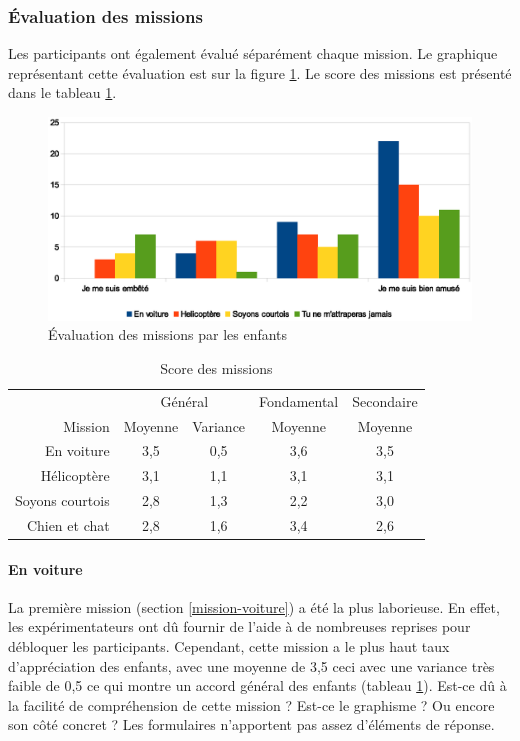 \subsubsection{Évaluation des missions}
\label{appreciation}
Les participants ont également évalué séparément chaque mission. Le graphique représentant cette évaluation est sur la figure \ref{fig:evaluation-mission}. Le score des \glspl{mission} est présenté dans le tableau \ref{tab:form-missions}.
\begin{figure}
  \begin{center}
    \includegraphics[width=\textwidth]{content/8-validation/images/aimer}
    \caption{Évaluation des missions par les enfants}
    \label{fig:evaluation-mission}
  \end{center}
\end{figure}

\begin{table}
  \begin{center}
    \begin{tabular}{r|cc|c|c}
                       & \multicolumn{2}{c|}{Général} & Fondamental & Secondaire \\
      Mission          & Moyenne & Variance           & Moyenne     & Moyenne \\ \hline
      En voiture       & 3,5 & 0,5 & 3,6 & 3,5 \\
      Hélicoptère      & 3,1 & 1,1 & 3,1 & 3,1 \\
      Soyons courtois  & 2,8 & 1,3 & 2,2 & 3,0 \\
      Chien et chat    & 2,8 & 1,6 & 3,4 & 2,6 \\
    \end{tabular}
  \end{center}
  \caption{Score des missions}
  \label{tab:form-missions}
\end{table}

\paragraph{En voiture}
La première \gls{mission} (section \ref{mission-voiture}) a été la plus laborieuse. En effet, les expérimentateurs ont dû fournir de l'aide à de nombreuses reprises pour débloquer les participants. Cependant, cette \gls{mission} a le plus haut taux d'appréciation des enfants, avec une moyenne de 3,5 ceci avec une variance très faible de 0,5 ce qui montre un accord général des enfants (tableau \ref{tab:form-missions}). Est-ce dû à la facilité de compréhension de cette \gls{mission} ? Est-ce le graphisme ? Ou encore son côté concret ? Les formulaires n'apportent pas assez d'éléments de réponse.


